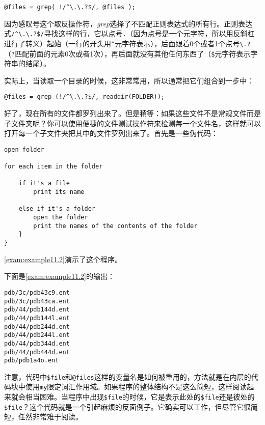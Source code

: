 \begin{lstlisting}
@files = grep( !/^\.\.?$/, @files );
\end{lstlisting}

因为感叹号这个取反操作符，\textit{grep}选择了不匹配正则表达式的所有行。正则表达式\verb|/^\.\.?$/|寻找这样的行，它以点号\verb|.|（因为点号是一个元字符，所以用反斜杠进行了转义）起始（一行的开头用\verb|^|元字符表示），后面跟着0个或者1个点号\verb|\.?|（\verb|?|匹配前面的元素0次或者1次），再后面就没有其他任何东西了（\verb|$|元字符表示字符串的结尾）。

实际上，当读取一个目录的时候，这非常常用，所以通常把它们组合到一步中：

\begin{lstlisting}
@files = grep (!/^\.\.?$/, readdir(FOLDER));
\end{lstlisting}

好了，现在所有的文件都罗列出来了。但是稍等：如果这些文件不是常规文件而是子文件夹呢？你可以使用便捷的文件测试操作符来检测每一个文件名，这样就可以打开每一个子文件夹把其中的文件罗列出来了。首先是一些伪代码：

\begin{lstlisting}
open folder

for each item in the folder

    if it's a file
        print its name

    else if it's a folder
        open the folder
        print the names of the contents of the folder
    }
}
\end{lstlisting}

\autoref{exam:example11.2}演示了这个程序。



下面是\autoref{exam:example11.2}的输出：

\begin{lstlisting}
pdb/3c/pdb43c9.ent
pdb/3c/pdb43ca.ent
pdb/44/pdb144d.ent
pdb/44/pdb144l.ent
pdb/44/pdb244d.ent
pdb/44/pdb244l.ent
pdb/44/pdb344d.ent
pdb/44/pdb444d.ent
pdb/pdb1a4o.ent
\end{lstlisting}

注意，代码中\verb|$file|和\verb|@files|这样的变量名是如何被重用的，方法就是在内层的代码块中使用\verb|my|限定词汇作用域。如果程序的整体结构不是这么简短，这样阅读起来就会相当困难。当程序中出现\verb|$file|的时候，它是表示此处的\verb|$file|还是彼处的\verb|$file|？这个代码就是一个引起麻烦的反面例子。它确实可以工作，但尽管它很简短，任然非常难于阅读。

